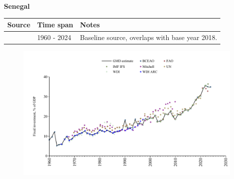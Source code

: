\documentclass[12pt,a4paper,landscape]{article}
\begin{document}
\begin{adjustbox}{max totalsize={\paperwidth}{\paperheight},center}
\begin{minipage}[t][\textheight][t]{\textwidth}
\vspace*{0.5cm}
{}
\begin{center}
{\Large\bfseries Senegal}
\end{center}
\vspace{0.5cm}
\begin{table}[H]
\centering
\small
\begin{tabular}{|l|l|l|}
\hline
\textbf{Source} & \textbf{Time span} & \textbf{Notes} \\
\hline
\rowcolor{white}\cite{BCEAO}& 1960 - 2024 &Baseline source, overlaps with base year 2018.\\
\hline
\end{tabular}
\end{table}
\begin{figure}[H]
\centering
\includegraphics[width=\textwidth,height=0.6\textheight,keepaspectratio]{graphs/SEN_finv_GDP.pdf}
\end{figure}
\end{minipage}
\end{adjustbox}
\end{document}
